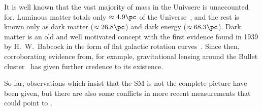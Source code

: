 It is well known that the vast majority of mass in the Univsere is unaccounted for.
Luminous matter totals only $\approx4.9\pc$ of the Universe~\cite{Adam:2015rua,PDG2014}, and the rest
is known only as dark matter ($\approx26.8\pc$) and dark energy ($\approx68.3\pc$).
Dark matter is an old and well motivated concept with the first evidence found in 1939 by H.~W.~Babcock
in the form of flat galactic rotation curves~\cite{1970ApJ...159..379R,1980ApJ...238..471R}.
Since then, corroborating evidence from, for example, gravitational lensing around the Bullet
cluster~\cite{Markevitch:2003at} has given further credence to its existence.





So far, observations which insist that the SM is not the complete picture have been given, but
there are also some conflicts in more recent measurements that could point to \np.

